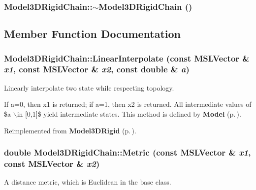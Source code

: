 \subsubsection{\setlength{\rightskip}{0pt plus 5cm}Model3DRigid\-Chain::$\sim$Model3DRigid\-Chain ()\hspace{0.3cm}{\tt  [inline, virtual]}}\label{classModel3DRigidChain_a1}




\subsection{Member Function Documentation}
\subsubsection{ Model3DRigid\-Chain::Linear\-Interpolate (const {\bf MSLVector} \& {\em x1}, const {\bf MSLVector} \& {\em x2}, const double \& {\em a})\hspace{0.3cm}{\tt  [virtual]}}\label{classModel3DRigidChain_a4}


Linearly interpolate two state while respecting topology.

If a=0, then x1 is returned; if a=1, then x2 is returned. All intermediate values of \$a $\backslash$in [0,1]\$ yield intermediate states. This method is defined by {\bf Model} {\rm (p.\,\pageref{classModel})}. 

Reimplemented from {\bf Model3DRigid} {\rm (p.\,\pageref{classModel3DRigid_a5})}.
\subsubsection{\setlength{\rightskip}{0pt plus 5cm}double Model3DRigid\-Chain::Metric (const {\bf MSLVector} \& {\em x1}, const {\bf MSLVector} \& {\em x2})\hspace{0.3cm}{\tt  [virtual]}}\label{classModel3DRigidChain_a5}


A distance metric, which is Euclidean in the base class.



